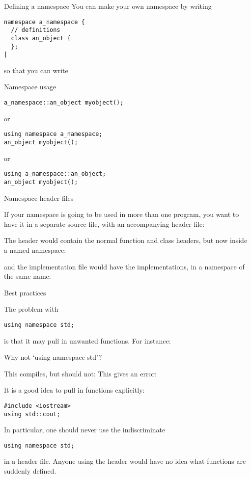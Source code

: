 \begin{block}{Defining a namespace}
  \label{sl:namespace-def}
  You can make your own namespace by writing
\begin{verbatim}
namespace a_namespace {
  // definitions
  class an_object { 
  };
|
\end{verbatim}
\end{block}

so that you can write
\begin{block}{Namespace usage}
  \label{sl:namespace-use}
\begin{verbatim}
a_namespace::an_object myobject();
\end{verbatim}
or
\begin{verbatim}
using namespace a_namespace;
an_object myobject();
\end{verbatim}
or
\begin{verbatim}
using a_namespace::an_object;
an_object myobject();
\end{verbatim}
\end{block}

 {Namespace header files}

If your namespace is going to be used in more than one program, you
want to have it in a separate source file, with an accompanying header
file:
%

The header would contain the normal function and class headers, but
now inside a named namespace:
%

and the implementation file would have the implementations, in a
namespace of the same name:
%

 {Best practices}

The problem with
\begin{verbatim}
using namespace std;
\end{verbatim}
is that it may pull in unwanted functions. For instance:

\begin{block}{Why not `using namespace std'?}
  \label{sl:namespace-std-harm}
  \begin{multicols}{2}
    This compiles, but should not:
    \vfill\columnbreak
    This gives an error:
  \end{multicols}
\end{block}

It is a good idea to pull in functions explicitly:
\begin{verbatim}
#include <iostream>
using std::cout;
\end{verbatim}

In particular, one should never use the indiscriminate
\begin{verbatim}
using namespace std;
\end{verbatim}
in a header file. Anyone using the header would have no idea what
functions are suddenly defined.
